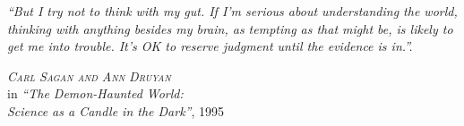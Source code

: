 
\begin{epigrafe} %

\hypertarget{estilo:epigrafe}{} %

\textit{\large``But I try not to think with my gut. If I'm serious about understanding the world, thinking with anything besides my brain, as tempting as that might be, is likely to get me into trouble. It's OK to reserve judgment until the evidence is in.''.}

\vspace{1cm}

\hspace{4cm} \emph{\textsc{Carl Sagan and Ann Druyan}}\\
\hspace{4cm} in \textsl{``The Demon-Haunted World:}\\
\hspace{4cm} \textsl{Science as a Candle in the Dark''}, 1995

\end{epigrafe}
